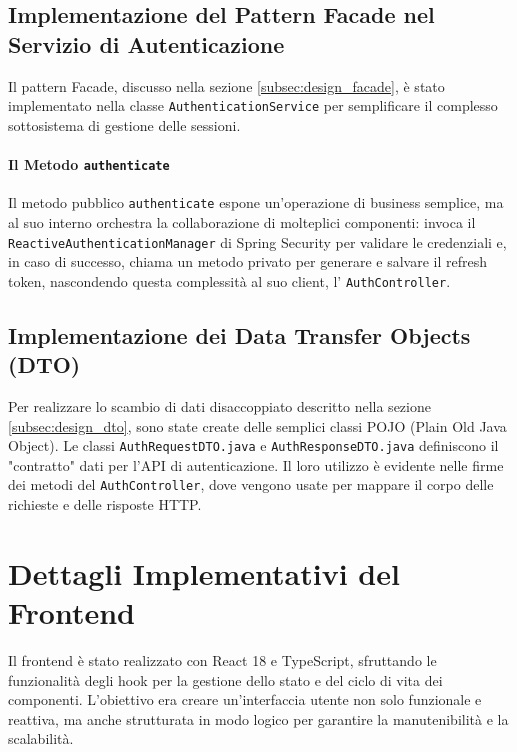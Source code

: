 \documentclass[12pt,a4paper,openright,twoside]{book}
\begin{document}
\subsection{Implementazione del Pattern Facade nel Servizio di Autenticazione}
\label{subsec:impl_facade}
Il pattern Facade, discusso nella sezione \ref{subsec:design_facade}, è stato implementato nella classe \texttt{AuthenticationService} per semplificare il complesso sottosistema di gestione delle sessioni.

\paragraph{Il Metodo \texttt{authenticate}}
Il metodo pubblico \texttt{authenticate} espone un'operazione di business semplice, ma al suo interno orchestra la collaborazione di molteplici componenti: invoca il \texttt{ReactiveAuthenticationManager} di Spring Security per validare le credenziali e, in caso di successo, chiama un metodo privato per generare e salvare il refresh token, nascondendo questa complessità al suo client, l' \texttt{AuthController}.


\subsection{Implementazione dei Data Transfer Objects (DTO)}
\label{subsec:impl_dto}
Per realizzare lo scambio di dati disaccoppiato descritto nella sezione \ref{subsec:design_dto}, sono state create delle semplici classi POJO (Plain Old Java Object). Le classi \texttt{AuthRequestDTO.java} e \texttt{AuthResponseDTO.java} definiscono il "contratto" dati per l'API di autenticazione. Il loro utilizzo è evidente nelle firme dei metodi del \texttt{AuthController}, dove vengono usate per mappare il corpo delle richieste e delle risposte HTTP.


\section{Dettagli Implementativi del Frontend}
\label{sec:impl_frontend}
Il frontend è stato realizzato con React 18 e TypeScript, sfruttando le funzionalità degli hook per la gestione dello stato e del ciclo di vita dei componenti. L'obiettivo era creare un'interfaccia utente non solo funzionale e reattiva, ma anche strutturata in modo logico per garantire la manutenibilità e la scalabilità.
\end{document}

